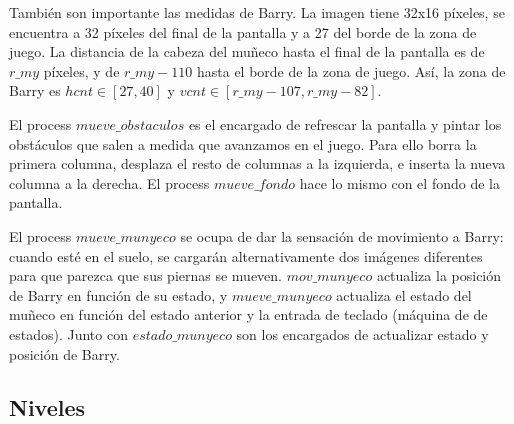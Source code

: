 \documentclass[11pt, a4paper, spanish, openright, twoside]{book}
\begin{document}
También son importante las medidas de Barry. La imagen tiene 32x16 píxeles, se encuentra a 32 píxeles del final de la pantalla y a 27 del borde de la zona de juego. La distancia de la cabeza del muñeco hasta el final de la pantalla es de $r\_my$ píxeles, y de $r\_my-110$ hasta el borde de la zona de juego. Así, la zona de Barry es $hcnt \in [27, 40]$ y $vcnt \in [r\_my-107, r\_my -82]$.


El process $mueve\_obstaculos$ es el encargado de refrescar la pantalla y pintar los obstáculos que salen a medida que avanzamos en el juego. Para ello borra la primera columna, desplaza el resto de columnas a la izquierda, e inserta la nueva columna a la derecha. El process $mueve\_fondo$ hace lo mismo con el fondo de la pantalla.


El process $mueve\_munyeco$ se ocupa de dar la sensación de movimiento a Barry: cuando esté en el suelo, se cargarán alternativamente dos imágenes diferentes para que parezca que sus piernas se mueven.
$mov\_munyeco$ actualiza la posición de Barry en función de su estado, y $mueve\_munyeco$ actualiza el estado del muñeco en función del estado anterior y la entrada de teclado (máquina de de estados). Junto con $estado\_munyeco$ son los encargados de actualizar estado y posición de Barry.


\subsection{Niveles}
\end{document}
